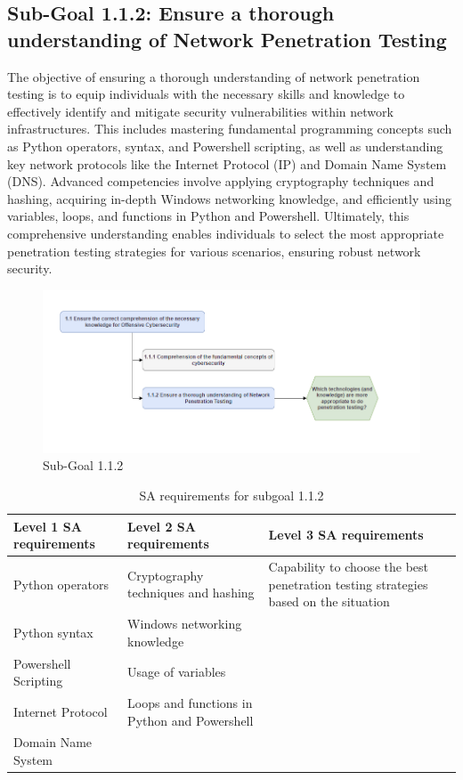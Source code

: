 \newpage
\subsection{Sub-Goal 1.1.2: Ensure a thorough understanding of Network Penetration Testing}
The objective of ensuring a thorough understanding of network penetration testing is to equip individuals with the necessary skills and knowledge to effectively identify and mitigate security vulnerabilities within network infrastructures. This includes mastering fundamental programming concepts such as Python operators, syntax, and Powershell scripting, as well as understanding key network protocols like the Internet Protocol (IP) and Domain Name System (DNS). Advanced competencies involve applying cryptography techniques and hashing, acquiring in-depth Windows networking knowledge, and efficiently using variables, loops, and functions in Python and Powershell. Ultimately, this comprehensive understanding enables individuals to select the most appropriate penetration testing strategies for various scenarios, ensuring robust network security.

\begin{figure}[H]
    \centering
    \includegraphics[width=\textwidth]{./assets/subgoal_1.1.2.png}
    \caption{Sub-Goal 1.1.2}
    \label{fig:subgoal_1.1.2}
\end{figure}

\begin{table}[H]
    \begin{center}
    \begin{tabular}{ | m{5cm} | m{5cm}| m{5cm} | } 
      \hline
      \textbf{Level 1 SA requirements} & \textbf{Level 2 SA requirements}  & \textbf{Level 3 SA requirements}  \\ 
      \hline
      Python operators & Cryptography techniques and hashing & Capability to choose the best penetration testing strategies based on the situation\\ 
      \hline
      Python syntax & Windows networking knowledge & \\ 
      \hline
      Powershell Scripting & Usage of variables & \\ 
      \hline
      Internet Protocol & Loops and functions in Python and Powershell  & \\ 
      \hline
      Domain Name System &  & \\ 
      \hline
    \end{tabular}
    \end{center}
    \caption{SA requirements for subgoal 1.1.2}
    \end{table}

